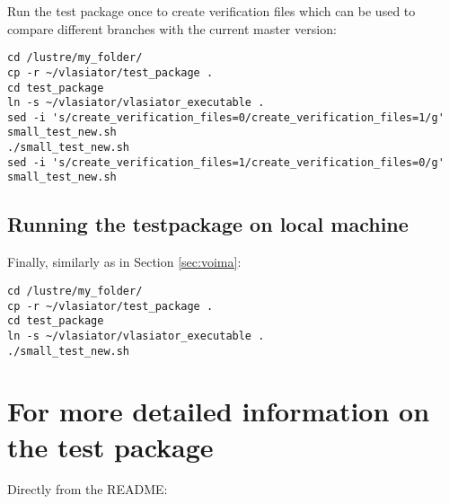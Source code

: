 \documentclass[a4paper,10pt]{article}
\begin{document}
Run the test package once to create verification files which can be used to compare 
different branches with the current master version:

\begin{verbatim}
cd /lustre/my_folder/
cp -r ~/vlasiator/test_package .
cd test_package
ln -s ~/vlasiator/vlasiator_executable .
sed -i 's/create_verification_files=0/create_verification_files=1/g' small_test_new.sh
./small_test_new.sh
sed -i 's/create_verification_files=1/create_verification_files=0/g' small_test_new.sh
\end{verbatim}

\subsection{Running the testpackage on local machine}

Finally, similarly as in Section \ref{sec:voima}:

\begin{verbatim}
cd /lustre/my_folder/
cp -r ~/vlasiator/test_package .
cd test_package
ln -s ~/vlasiator/vlasiator_executable .
./small_test_new.sh
\end{verbatim}


\section{For more detailed information on the test package}

Directly from the README:
\end{document}
